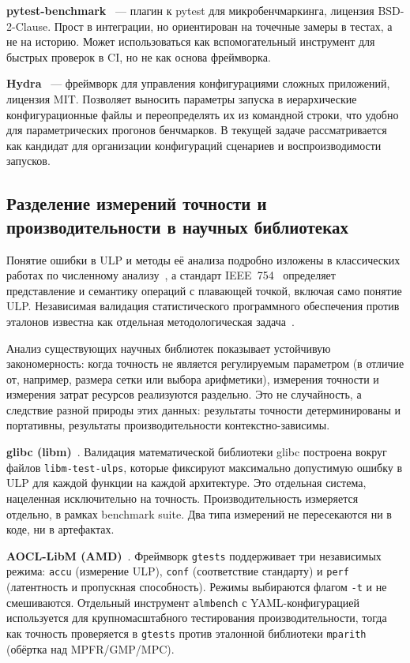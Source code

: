 \documentclass[12pt,a4paper]{article}
\begin{document}
\textbf{pytest-benchmark}~\cite{pytest_benchmark} --- плагин
к pytest для микробенчмаркинга, лицензия BSD-2-Clause. Прост
в интеграции, но ориентирован на точечные замеры в тестах,
а не на историю. Может использоваться как вспомогательный
инструмент для быстрых проверок в CI, но не как основа фреймворка.

\textbf{Hydra}~\cite{hydra} --- фреймворк для управления
конфигурациями сложных приложений, лицензия MIT. Позволяет
выносить параметры запуска в иерархические конфигурационные файлы
и переопределять их из командной строки, что удобно для
параметрических прогонов бенчмарков. В текущей задаче
рассматривается как кандидат для организации конфигураций
сценариев и воспроизводимости запусков.

\subsection{Разделение измерений точности и производительности
в научных библиотеках}

Понятие ошибки в ULP и методы её анализа подробно изложены
в классических работах по численному анализу~\cite{goldberg1991,
higham2002}, а стандарт IEEE~754~\cite{ieee754} определяет
представление и семантику операций с плавающей точкой, включая
само понятие ULP. Независимая валидация статистического
программного обеспечения против эталонов известна как отдельная
методологическая задача~\cite{mccullough1999}.

Анализ существующих научных библиотек показывает устойчивую
закономерность: когда точность не является регулируемым параметром
(в отличие от, например, размера сетки или выбора арифметики),
измерения точности и измерения затрат ресурсов реализуются
раздельно. Это не случайность, а следствие разной природы этих
данных: результаты точности детерминированы и портативны,
результаты производительности контекстно-зависимы.

\textbf{glibc (libm)}~\cite{glibc}. Валидация математической
библиотеки glibc построена вокруг файлов \texttt{libm-test-ulps},
которые фиксируют максимально допустимую ошибку в ULP для каждой
функции на каждой архитектуре. Это отдельная система, нацеленная
исключительно на точность. Производительность измеряется отдельно,
в рамках benchmark suite. Два типа измерений не пересекаются
ни в коде, ни в артефактах.

\textbf{AOCL-LibM (AMD)}~\cite{aocl_libm}. Фреймворк \texttt{gtests}
поддерживает три независимых режима: \texttt{accu} (измерение ULP),
\texttt{conf} (соответствие стандарту) и \texttt{perf} (латентность
и пропускная способность). Режимы выбираются флагом \texttt{-t}
и не смешиваются. Отдельный инструмент \texttt{almbench}
с YAML-конфигурацией используется для крупномасштабного
тестирования производительности, тогда как точность проверяется
в \texttt{gtests} против эталонной библиотеки \texttt{mparith}
(обёртка над MPFR/GMP/MPC).
\end{document}
